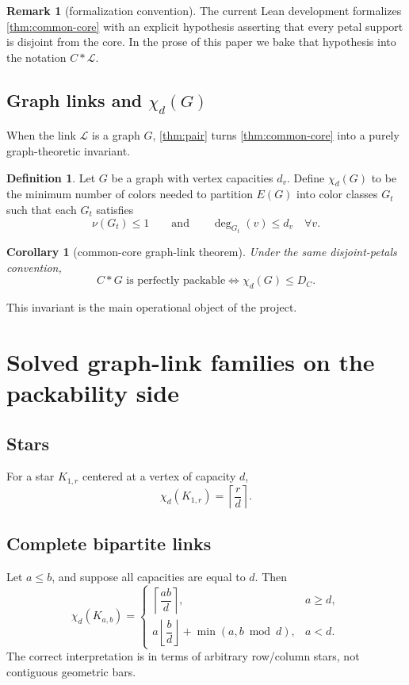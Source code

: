\documentclass[11pt]{article}
\newtheorem{corollary}[theorem]{Corollary}
\theoremstyle{definition}
\newtheorem{definition}[theorem]{Definition}
\newtheorem{remark}[theorem]{Remark}
\newcommand{\Chi}{\chi}
\newcommand{\Lk}{\mathcal L}
\begin{document}
\begin{remark}[formalization convention]
The current Lean development formalizes \cref{thm:common-core} with an explicit hypothesis asserting that every petal support is disjoint from the core. In the prose of this paper we bake that hypothesis into the notation \(C*\Lk\).
\end{remark}

\subsection{Graph links and \(\Chi_d(G)\)}
When the link \(\Lk\) is a graph \(G\), \cref{thm:pair} turns \cref{thm:common-core} into a purely graph-theoretic invariant.

\begin{definition}
Let \(G\) be a graph with vertex capacities \(d_v\). Define \(\Chi_d(G)\) to be the minimum number of colors needed to partition \(E(G)\) into color classes \(G_t\) such that each \(G_t\) satisfies
\[
\nu(G_t)\le 1
\qquad\text{and}\qquad
\deg_{G_t}(v)\le d_v\quad\forall v.
\]
\end{definition}

\begin{corollary}[common-core graph-link theorem]\label{cor:graph-link}
Under the same disjoint-petals convention,
\[
C*G\text{ is perfectly packable}
\iff
\Chi_d(G)\le D_C.
\]
\end{corollary}

This invariant is the main operational object of the project.

\section{Solved graph-link families on the packability side}
\subsection{Stars}
For a star \(K_{1,r}\) centered at a vertex of capacity \(d\),
\[
\Chi_d(K_{1,r})=\left\lceil \frac{r}{d}\right\rceil.
\]

\subsection{Complete bipartite links}
Let \(a\le b\), and suppose all capacities are equal to \(d\). Then
\[
\Chi_d(K_{a,b})=
\begin{cases}
\left\lceil \dfrac{ab}{d}\right\rceil,& a\ge d,\\[8pt]
a\left\lfloor \dfrac{b}{d}\right\rfloor+\min(a,b\bmod d),& a<d.
\end{cases}
\]
The correct interpretation is in terms of arbitrary row/column stars, not contiguous geometric bars.
\end{document}
